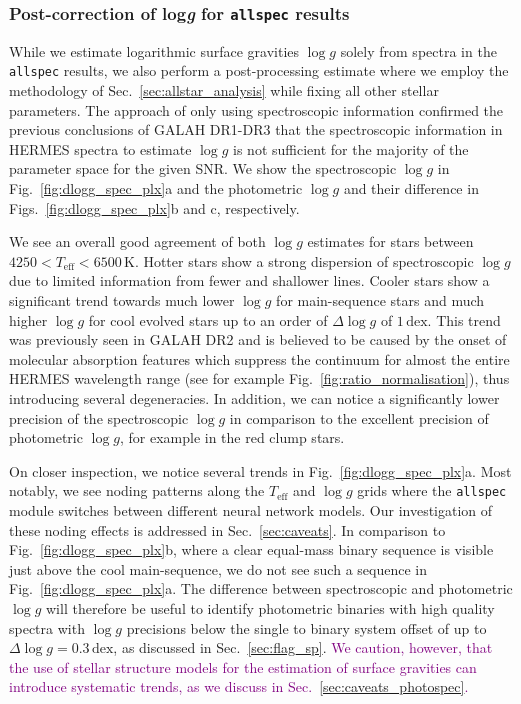 \documentclass[
  journal=pasa,
  manuscript=research-paper, %
  year=2024,
  volume=37
]{cup-journal}
\newcommand{\adjusted}[1]{{\textcolor{purple}{#1}}}
\newcommand{\Teff}{$T_\mathrm{eff}$\xspace}
\newcommand{\logg}{$\log g$\xspace}
\begin{document}
\subsubsection{Post-correction of {log\textit{g}} for \texttt{allspec} results}

While we estimate logarithmic surface gravities \logg solely from spectra in the \texttt{allspec} results, we also perform a post-processing estimate where we employ the methodology of Sec.~\ref{sec:allstar_analysis} while fixing all other stellar parameters. The approach of only using spectroscopic information confirmed the previous conclusions of GALAH DR1-DR3 that the spectroscopic information in HERMES spectra to estimate \logg is not sufficient for the majority of the parameter space for the given SNR. We show the spectroscopic \logg in Fig.~\ref{fig:dlogg_spec_plx}a and the photometric \logg and their difference in Figs.~\ref{fig:dlogg_spec_plx}b and c, respectively.

We see an overall good agreement of both \logg estimates for stars between $4250 < T_\text{eff} < 6500\,\mathrm{K}$. Hotter stars show a strong dispersion of spectroscopic \logg due to limited information from fewer and shallower lines. Cooler stars show a significant trend towards much lower \logg for main-sequence stars and much higher \logg for cool evolved stars up to an order of $\Delta \log g$ of $1\,\mathrm{dex}$. This trend was previously seen in GALAH DR2 \citep{Buder2018} and is believed to be caused by the onset of molecular absorption features which suppress the continuum for almost the entire HERMES wavelength range (see for example Fig.~\ref{fig:ratio_normalisation}), thus introducing several degeneracies. In addition, we can notice a significantly lower precision of the spectroscopic \logg in comparison to the excellent precision of photometric \logg, for example in the red clump stars.

On closer inspection, we notice several trends in Fig.~\ref{fig:dlogg_spec_plx}a. Most notably, we see noding patterns along the \Teff and \logg grids where the \texttt{allspec} module switches between different neural network models. Our investigation of these noding effects is addressed in Sec.~\ref{sec:caveats}. In comparison to Fig.~\ref{fig:dlogg_spec_plx}b, where a clear equal-mass binary sequence is visible just above the cool main-sequence, we do not see such a sequence in Fig.~\ref{fig:dlogg_spec_plx}a. The difference between spectroscopic and photometric \logg will therefore be useful to identify photometric binaries with high quality spectra with \logg precisions below the single to binary system offset of up to $\Delta \log g = 0.3\,\mathrm{dex}$, as discussed in Sec.~\ref{sec:flag_sp}. \adjusted{We caution, however, that the use of stellar structure models for the estimation of surface gravities can introduce systematic trends, as we discuss in Sec.~\ref{sec:caveats_photospec}.}
\end{document}
